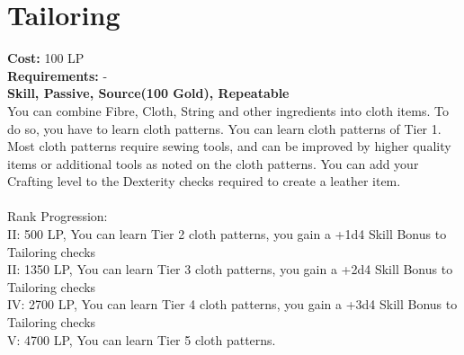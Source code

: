 \section{Tailoring}\label{perk:tailoring}
\textbf{Cost:} 100 LP\\
\textbf{Requirements:} -\\
\textbf{Skill, Passive, Source(100 Gold), Repeatable}\\
You can combine Fibre, Cloth, String and other ingredients into cloth items.
To do so, you have to learn cloth patterns.
You can learn cloth patterns of Tier 1.
Most cloth patterns require sewing tools, and can be improved by higher quality items or additional tools as noted on the cloth patterns.
You can add your Crafting level to the Dexterity checks required to create a leather item.\\
\\
Rank Progression:\\
II: 500 LP, You can learn Tier 2 cloth patterns, you gain a +1d4 Skill Bonus to Tailoring checks\\
II: 1350 LP, You can learn Tier 3 cloth patterns, you gain a +2d4 Skill Bonus to Tailoring checks\\
IV: 2700 LP, You can learn Tier 4 cloth patterns, you gain a +3d4 Skill Bonus to Tailoring checks\\
V: 4700 LP, You can learn Tier 5 cloth patterns.\\